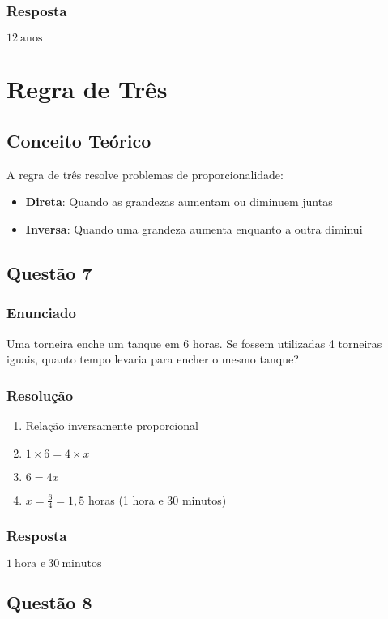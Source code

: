 \documentclass[11pt]{article}
\begin{document}
\subsubsection*{Resposta}
$\boxed{12\ \text{anos}}$

\section{Regra de Três}

\subsection{Conceito Teórico}
A regra de três resolve problemas de proporcionalidade:
\begin{itemize}
\item \textbf{Direta}: Quando as grandezas aumentam ou diminuem juntas
\item \textbf{Inversa}: Quando uma grandeza aumenta enquanto a outra diminui
\end{itemize}

\subsection{Questão 7}
\subsubsection*{Enunciado}
Uma torneira enche um tanque em 6 horas. Se fossem utilizadas 4 torneiras iguais, quanto tempo levaria para encher o mesmo tanque?

\subsubsection*{Resolução}
\begin{enumerate}
\item Relação inversamente proporcional
\item $1 \times 6 = 4 \times x$
\item $6 = 4x$
\item $x = \frac{6}{4} = 1,5$ horas (1 hora e 30 minutos)
\end{enumerate}

\subsubsection*{Resposta}
$\boxed{1\ \text{hora e}\ 30\ \text{minutos}}$

\subsection{Questão 8}
\end{document}
